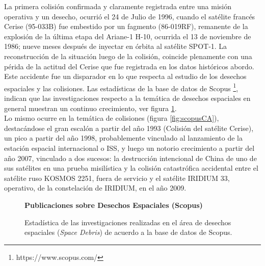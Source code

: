La primera colisi\'on confirmada y claramente registrada entre una misi\'on operativa y un desecho, ocurri\'o el 24 de Julio de 1996, cuando el sat\'elite franc\'es Cerise (95-033B) fue embestido por un fagmento (86-019RF), remanente de la explosi\'on de la \'ultima etapa del Ariane-1 H-10, ocurrida el 13 de noviembre de 1986; nueve meses despu\'es de inyectar en \'orbita al sat\'elite SPOT-1. La reconstrucci\'on de la situaci\'on luego de la colisi\'on, coincide plenamente con una p\'erida de la actitud del Cerise que fue registrada en los datos hist\'oricos abordo. \citep{KlinkradChapter8}\\

Este accidente fue un disparador en lo que respecta al estudio de los desechos espaciales y las colisiones. Las estad\'isticas de la base de datos de Scopus \footnote{https://www.scopus.com/}, indican que las investigaciones respecto a la tem\'atica de desechos espaciales en general muestran un continuo crecimiento, ver figura \ref{fig:scopusSD}.\\
Lo mismo ocurre en la tem\'atica de colisiones (figura \ref{fig:scopusCA}), destac\'andose el gran escal\'on a partir del a\~no 1993 (Colisi\'on del sat\'elite Cerise), un pico a partir del a\~no 1998, probablemente vinculado al lanzamiento de la estaci\'on espacial internacional o \ac{ISS}, y luego un notorio crecimiento a partir del a\~no 2007, vinculado a dos sucesos: la destrucci\'on intencional de China de uno de sus sat\'elites en una prueba misil\'istica y la colisi\'on catastr\'ofica accidental entre el sat\'elite ruso KOSMOS 2251, fuera de servicio y el sat\'elite IRIDIUM 33, operativo, de la constelaci\'on de IRIDIUM, en el a\~no 2009.\\


\begin{figure}[!h]
\centering
  \textbf{Publicaciones sobre Desechos Espaciales (Scopus)}\par\medskip
    \caption[Desechos Espaciales seg\'un Scopus]{Estad\'istica de las investigaciones realizadas en el \'area de desechos espaciales ({\it{Space Debris}}) de acuerdo a la base de datos de Scopus.}
    \label{fig:scopusSD}
\end{figure}

